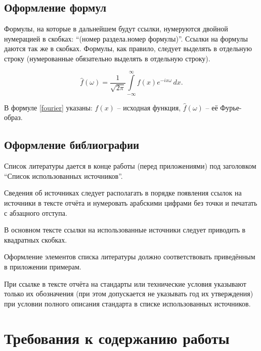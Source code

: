 \documentclass[utf8,14pt, coursreport]{G7-32}
\begin{document}
\section{Оформление формул}

Формулы, на которые в дальнейшем будут ссылки, нумеруются двойной нумерацией в скобках: ``(номер раздела.номер формулы)''. Ссылки на формулы даются так же в скобках. Формулы, как правило, следует выделять в отдельную строку (нумерованные обязательно выделять в отдельную строку).

\begin{equation}\label{fourier}
\hat{f}(\omega)=\frac{1}{\sqrt{2\pi}}\int\limits_{-\infty}^{\infty}f(x)e^{-ix\omega}\,dx.
\end{equation}

В формуле \eqref{fourier} указаны: $f(x)$ -- исходная функция, $\hat{f}(\omega)$ -- её Фурье-образ.

\section{Оформление библиографии}

Список литературы дается в конце работы (перед приложениями) под заголовком ``Список использованных источников''.

Сведения об источниках следует располагать в порядке появления ссылок на источники в тексте отчёта и нумеровать арабскими цифрами без точки и печатать с абзацного отступа.

В основном тексте ссылки на использованные источники следует приводить в квадратных скобках.

Оформление элементов списка литературы должно соответствовать приведённым в приложении примерам.

При ссылке в тексте отчёта на стандарты или технические условия указывают только их обозначения (при этом допускается не указывать год их утверждения) при условии полного описания стандарта в списке использованных источников.




\chapter{Требования к содержанию работы}
\end{document}
